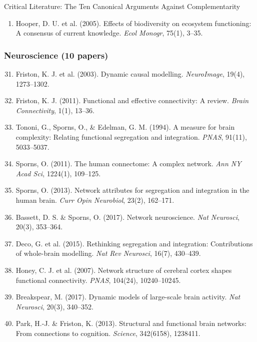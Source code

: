 \begin{chapter}{Critical Literature: The Ten Canonical Arguments Against Complementarity}
\begin{enumerate}
    \item Hooper, D. U. et al. (2005). Effects of biodiversity on ecosystem functioning: A consensus of current knowledge. \textit{Ecol Monogr}, 75(1), 3--35.
\end{enumerate}

\subsubsection{Neuroscience (10 papers)}

\begin{enumerate}
    \setcounter{enumi}{30}
    \item Friston, K. J. et al. (2003). Dynamic causal modelling. \textit{NeuroImage}, 19(4), 1273--1302.

    \item Friston, K. J. (2011). Functional and effective connectivity: A review. \textit{Brain Connectivity}, 1(1), 13--36.

    \item Tononi, G., Sporns, O., \& Edelman, G. M. (1994). A measure for brain complexity: Relating functional segregation and integration. \textit{PNAS}, 91(11), 5033--5037.

    \item Sporns, O. (2011). The human connectome: A complex network. \textit{Ann NY Acad Sci}, 1224(1), 109--125.

    \item Sporns, O. (2013). Network attributes for segregation and integration in the human brain. \textit{Curr Opin Neurobiol}, 23(2), 162--171.

    \item Bassett, D. S. \& Sporns, O. (2017). Network neuroscience. \textit{Nat Neurosci}, 20(3), 353--364.

    \item Deco, G. et al. (2015). Rethinking segregation and integration: Contributions of whole-brain modelling. \textit{Nat Rev Neurosci}, 16(7), 430--439.

    \item Honey, C. J. et al. (2007). Network structure of cerebral cortex shapes functional connectivity. \textit{PNAS}, 104(24), 10240--10245.

    \item Breakspear, M. (2017). Dynamic models of large-scale brain activity. \textit{Nat Neurosci}, 20(3), 340--352.

    \item Park, H.-J. \& Friston, K. (2013). Structural and functional brain networks: From connections to cognition. \textit{Science}, 342(6158), 1238411.
\end{enumerate}


\end{chapter}
